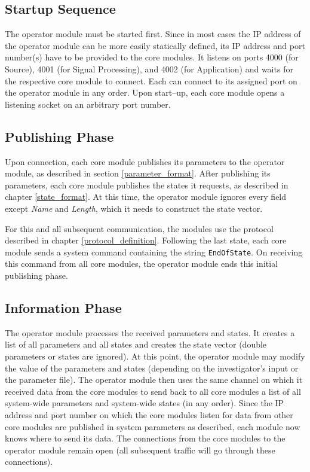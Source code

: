 \documentclass[letterpaper,oneside,12pt]{book}
\begin{document}
\subsection{Startup Sequence}

The operator module must be started first. Since in most cases the IP address of 
the operator module can be more easily statically defined, its IP address and 
port number(s) have to be provided to the core modules. It listens on ports 4000 
(for Source), 4001 (for Signal Processing), and 4002 (for Application) and 
waits for the respective core module to connect. Each can connect to its 
assigned port on the operator module in any order. Upon start--up, each core 
module opens a listening socket on an arbitrary port number.

\subsection{Publishing Phase}

Upon connection, each core module publishes its parameters to the operator 
module, as described in section \ref{parameter_format}. After publishing its 
parameters, each core module publishes the states it requests, as described in 
chapter \ref{state_format}. At this time, the operator module ignores every 
field except \textit{Name} and \textit{Length}, which it needs to construct the 
state vector.

For this and all subsequent communication, the modules use the protocol 
described in chapter \ref{protocol_definition}. Following the last state, each core module sends a system command containing the string \texttt{EndOfState}.
On receiving this command from all core modules, the operator module ends 
this initial publishing phase.

\subsection{Information Phase}

The operator module processes the received parameters and states. It creates a 
list of all parameters and all states and creates the state vector (double 
parameters or states are ignored). At this point, the operator module may modify 
the value of the parameters and states (depending on the investigator's input or 
the parameter file). The operator module then uses the same channel on which it 
received data from the core modules to send back to all core modules a list of 
all system-wide parameters and system-wide states (in any order). Since the IP 
address and port number on which the core modules listen for data from other 
core modules are published in system parameters as described, each module now 
knows where to send its data. The connections from the core modules to the 
operator module remain open (all subsequent traffic will go through these 
connections).
\end{document}
